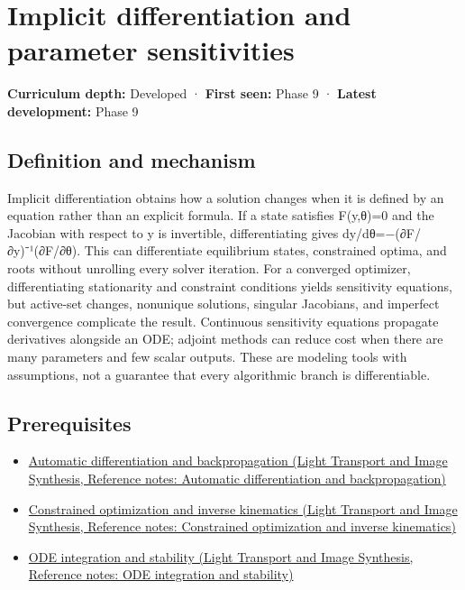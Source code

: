 \hypertarget{appendix-8836553d56fc}{}\label{referencestart:appendix-8836553d56fc}
\section{Implicit differentiation and parameter sensitivities}\label{appendix-8836553d56fc-implicit-differentiation-and-parameter-sensitivities}

\textbf{Curriculum depth:} Developed · \textbf{First seen:} Phase 9 · \textbf{Latest development:} Phase 9

\begin{allmightroledefinition}

\subsection{Definition and mechanism}\label{appendix-8836553d56fc-definition-and-mechanism}

Implicit differentiation obtains how a solution changes when it is defined by an equation rather than an explicit formula. If a state satisfies F(y,θ)=0 and the Jacobian with respect to y is invertible, differentiating gives dy/dθ=−(∂F/∂y)⁻¹(∂F/∂θ). This can differentiate equilibrium states, constrained optima, and roots without unrolling every solver iteration. For a converged optimizer, differentiating stationarity and constraint conditions yields sensitivity equations, but active-set changes, nonunique solutions, singular Jacobians, and imperfect convergence complicate the result. Continuous sensitivity equations propagate derivatives alongside an ODE; adjoint methods can reduce cost when there are many parameters and few scalar outputs. These are modeling tools with assumptions, not a guarantee that every algorithmic branch is differentiable.

\end{allmightroledefinition}

\subsection{Prerequisites}\label{appendix-8836553d56fc-prerequisites}

\begin{itemize}
\tightlist
\item
  \href{../04-Light-Transport-and-Image-Synthesis/main.pdf\#nameddest=appendix-40df0855b4a7}{Automatic differentiation and backpropagation (Light Transport and Image Synthesis, Reference notes: Automatic differentiation and backpropagation)}
\item
  \href{../04-Light-Transport-and-Image-Synthesis/main.pdf\#nameddest=appendix-29f4bea4c2bb}{Constrained optimization and inverse kinematics (Light Transport and Image Synthesis, Reference notes: Constrained optimization and inverse kinematics)}
\item
  \href{../04-Light-Transport-and-Image-Synthesis/main.pdf\#nameddest=appendix-18eacf61a04b}{ODE integration and stability (Light Transport and Image Synthesis, Reference notes: ODE integration and stability)}
\end{itemize}

